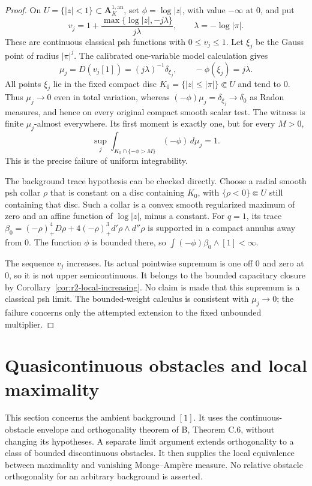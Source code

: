 \documentclass[11pt,a4paper]{article}
\numberwithin{equation}{section}
\theoremstyle{definition}
\theoremstyle{remark}
\newcommand{\an}{\mathrm{an}}
\begin{document}
\begin{proof}
On $U=\{|z|<1\}\subset\mathbf A^{1,\an}_K$, set
$\phi=\log|z|$, with value $-\infty$ at $0$, and put
\[
 v_j=1+\frac{\max\{\log|z|,-j\lambda\}}{j\lambda},
 \qquad \lambda=-\log|\pi|.
\]
These are continuous classical psh functions with $0\leq v_j\leq1$.
Let $\xi_j$ be the Gauss point of radius $|\pi|^j$. The calibrated
one-variable model calculation gives
\[
 \mu_j=D(v_j[1])=(j\lambda)^{-1}\delta_{\xi_j},
 \qquad -\phi(\xi_j)=j\lambda.
\]
All points $\xi_j$ lie in the fixed compact disc
$K_0=\{|z|\leq|\pi|\}\Subset U$ and tend to $0$.
Thus $\mu_j\to0$ even in total variation, whereas
$(-\phi)\mu_j=\delta_{\xi_j}\to\delta_0$ as Radon measures,
and hence on every original compact smooth scalar test.
The witness is finite $\mu_j$-almost everywhere. Its first moment
is exactly one, but for every $M>0$,
\[
 \sup_j\int_{K_0\cap\{-\phi>M\}}(-\phi)\,d\mu_j=1.
\]
This is the precise failure of uniform integrability.

The background trace hypothesis can be checked directly. Choose
a radial smooth psh collar $\rho$ that is constant on a disc
containing $K_0$, with $\{\rho<0\}\Subset U$ still containing
that disc. Such a collar is a convex smooth regularized maximum
of zero and an affine function of $\log|z|$, minus a constant.
For $q=1$, its trace
$\beta_0=(-\rho)_+^4D\rho+
4(-\rho)_+^3d'\rho\wedge d''\rho$ is supported in a compact
annulus away from $0$.
The function $\phi$ is bounded there, so
$\int(-\phi)\beta_0\wedge[1]<\infty$.

The sequence $v_j$ increases. Its actual pointwise supremum is
one off $0$ and zero at $0$, so it is not upper semicontinuous.
It belongs to the bounded capacitary closure by
Corollary~\ref{cor:r2-local-increasing}. No claim is made that
this supremum is a classical psh limit. The bounded-weight
calculus is consistent with $\mu_j\to0$; the failure concerns
only the attempted extension to the fixed unbounded multiplier.
\end{proof}



\section{Quasicontinuous obstacles and local maximality}
\label{sec:r2-obstacle-maximality}

This section concerns the ambient background $[1]$. It uses the
continuous-obstacle envelope and orthogonality theorem of
\textup{B}, Theorem C.6, without changing its hypotheses. A separate
limit argument extends orthogonality to a class of bounded
discontinuous obstacles. It then supplies the local equivalence
between maximality and vanishing Monge--Amp\`ere measure. No
relative obstacle orthogonality for an arbitrary background is
asserted.
\end{document}
